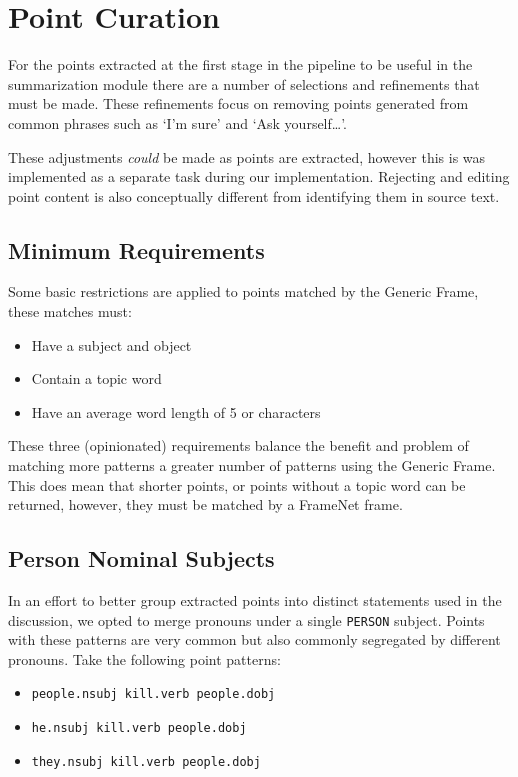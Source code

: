 \chapter{Point Curation\label{chap:point-curation}}
  For the points extracted at the first stage in the pipeline to be useful in the summarization module there are a number of selections and refinements that must be made. These refinements focus on removing points generated from common phrases such as `I'm sure' and `Ask yourself\dots'.

  These adjustments \textit{could} be made as points are extracted, however this is was implemented as a separate task during our implementation. Rejecting and editing point content is also conceptually different from identifying them in source text.

  \section{Minimum Requirements}
    Some basic restrictions are applied to points matched by the Generic Frame, these matches must:

    \begin{itemize}
      \item{Have a subject and object}
      \item{Contain a topic word}
      \item{Have an average word length of 5 or characters}
    \end{itemize}

    These three (opinionated) requirements balance the benefit and problem of matching more patterns a greater number of patterns using the Generic Frame. This does mean that shorter points, or points without a topic word can be returned, however, they must be matched by a FrameNet frame.

  \section{Person Nominal Subjects}
    In an effort to better group extracted points into distinct statements used in the discussion, we opted to merge pronouns under a single \texttt{PERSON} subject. Points with these patterns are very common but also commonly segregated by different pronouns. Take the following point patterns:
    \begin{itemize}
      \item{\texttt{people.nsubj kill.verb people.dobj}}
      \item{\texttt{he.nsubj kill.verb people.dobj}}
      \item{\texttt{they.nsubj kill.verb people.dobj}}
    \end{itemize}

